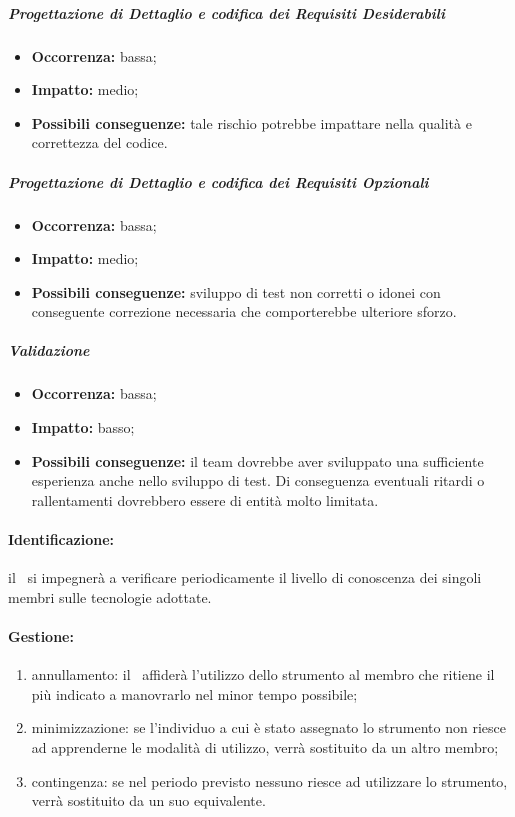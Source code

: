\documentclass[../PianoProgetto.tex]{subfiles}
\begin{document}
		\subparagraph*{Progettazione di Dettaglio e codifica dei Requisiti Desiderabili}
			\begin{itemize}[label={-}]
				\item \textbf{Occorrenza:} bassa;
				\item \textbf{Impatto:} medio;
				\item \textbf{Possibili conseguenze:} tale rischio potrebbe impattare nella qualità e correttezza del codice.
			\end{itemize}
		\subparagraph*{Progettazione di Dettaglio e codifica dei Requisiti Opzionali}
			\begin{itemize}[label={-}]
				\item \textbf{Occorrenza:} bassa;
				\item \textbf{Impatto:} medio;
				\item \textbf{Possibili conseguenze:} sviluppo di test non corretti o idonei con conseguente correzione necessaria che comporterebbe ulteriore sforzo.
			\end{itemize}
		\subparagraph*{Validazione}
			\begin{itemize}[label={-}]
				\item \textbf{Occorrenza:} bassa;
				\item \textbf{Impatto:} basso;
				\item \textbf{Possibili conseguenze:} il team dovrebbe aver sviluppato una sufficiente esperienza anche nello sviluppo di test. Di conseguenza eventuali ritardi o rallentamenti dovrebbero essere di entità molto limitata. 
			\end{itemize}
	
	\paragraph*{Identificazione:} il \responsabilediprogetto\ si impegnerà a verificare periodicamente il livello di conoscenza dei singoli membri sulle tecnologie adottate.
	
	\paragraph*{Gestione:}
	\begin{enumerate}
		\item annullamento: il \responsabilediprogetto\ affiderà l'utilizzo dello strumento al membro che ritiene il più indicato a manovrarlo nel minor tempo possibile;
		\item minimizzazione: se l'individuo a cui è stato assegnato lo strumento non riesce ad apprenderne le modalità di utilizzo, verrà sostituito da un altro membro;
		\item contingenza: se nel periodo previsto nessuno riesce ad utilizzare lo strumento, verrà sostituito da un suo equivalente. 
	\end{enumerate}		
	
\end{document}
